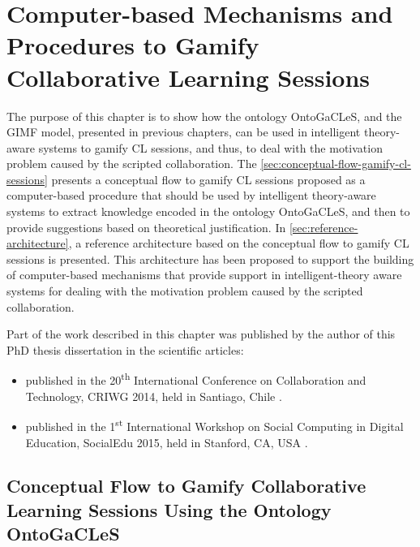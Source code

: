 \chapter[Computer-based Mechanisms and Procedures to Gamify CL Sessions]{Computer-based Mechanisms and Procedures to Gamify Collaborative Learning Sessions}
\label{chapter:computer-based-mechanisms-procedures}

The purpose of this chapter is to show how the ontology OntoGaCLeS, and the GIMF model, presented in previous chapters, can be used in intelligent theory-aware systems to gamify CL sessions, and thus, to deal with the motivation problem caused by the scripted collaboration.
The \autoref{sec:conceptual-flow-gamify-cl-sessions} presents a conceptual flow to gamify CL sessions proposed as a computer-based procedure that should be used by intelligent theory-aware systems to extract knowledge encoded in the ontology OntoGaCLeS, and then to provide suggestions based on theoretical justification.
In \autoref{sec:reference-architecture}, a reference architecture based on the conceptual flow to gamify CL sessions is presented.
This architecture has been proposed to support the building of computer-based mechanisms that provide support in intelligent-theory aware systems for dealing with the motivation problem caused by the scripted collaboration.

Part of the work described in this chapter was published by the author of this PhD thesis dissertation in the scientific
articles:

\begin{itemize}
\item {} published in the 20\textsuperscript{th} International Conference on Collaboration and Technology, CRIWG 2014, held in Santiago, Chile \cite{ChallcoMoreiraMizoguchiIsotani2014}.

\item {} published in the 1\textsuperscript{st} International Workshop on Social Computing in Digital Education, SocialEdu 2015, held in Stanford, CA, USA \cite{ChallcoMizoguchiBittencourtIsotani2015}.
\end{itemize}

\section[Conceptual Flow to Gamify CL Sessions Using the Ontology OntoGaCLeS]{Conceptual Flow to Gamify Collaborative Learning Sessions Using the Ontology OntoGaCLeS}
\label{sec:conceptual-flow-gamify-cl-sessions}

